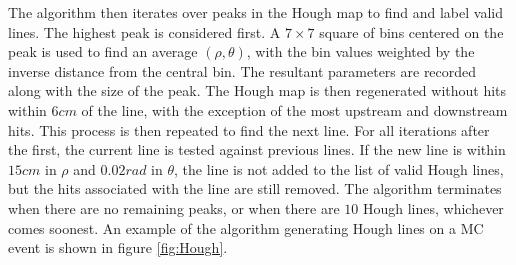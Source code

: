 The algorithm then iterates over peaks in the Hough map to find and label valid lines. The highest peak is considered first. A $7\times7$ square of bins centered on the peak is used to find an average $(\rho, \theta)$, with the bin values weighted by the inverse distance from the central bin. The resultant parameters are recorded along with the size of the peak. The Hough map is then regenerated without hits within $6\unit{cm}$ of the line, with the exception of the most upstream and downstream hits. This process is then repeated to find the next line. For all iterations after the first, the current line is tested against previous lines. If the new line is within $15\unit{cm}$ in $\rho$ and $0.02\unit{rad}$ in $\theta$, the line is not added to the list of valid Hough lines, but the hits associated with the line are still removed. The algorithm terminates when there are no remaining peaks, or when there are $10$ Hough lines, whichever comes soonest. An example of the algorithm generating Hough lines on a MC event is shown in figure \ref{fig:Hough}.
